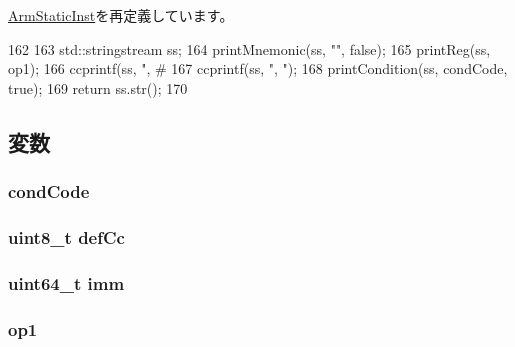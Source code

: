 \hyperlink{classArmISA_1_1ArmStaticInst_a95d323a22a5f07e14d6b4c9385a91896}{ArmStaticInst}を再定義しています。


\begin{DoxyCode}
162 {
163     std::stringstream ss;
164     printMnemonic(ss, "", false);
165     printReg(ss, op1);
166     ccprintf(ss, ", #%
167     ccprintf(ss, ", ");
168     printCondition(ss, condCode, true);
169     return ss.str();
170 }
\end{DoxyCode}


\subsection{変数}
\hypertarget{classArmISA_1_1DataXCondCompImmOp_a273dc0fe84de8f4a9cf52aaf8dc27885}{
\subsubsection[{condCode}]{ {\bf condCode}}}
\label{classArmISA_1_1DataXCondCompImmOp_a273dc0fe84de8f4a9cf52aaf8dc27885}
\hypertarget{classArmISA_1_1DataXCondCompImmOp_a67b4730d4f641c62c31e1b7724f93433}{
\subsubsection[{defCc}]{\setlength{\rightskip}{0pt plus 5cm}uint8\_\-t {\bf defCc}}}
\label{classArmISA_1_1DataXCondCompImmOp_a67b4730d4f641c62c31e1b7724f93433}
\hypertarget{classArmISA_1_1DataXCondCompImmOp_a2b4406ad2843b5aa12d244d01d8fdc69}{
\subsubsection[{imm}]{\setlength{\rightskip}{0pt plus 5cm}uint64\_\-t {\bf imm}}}
\label{classArmISA_1_1DataXCondCompImmOp_a2b4406ad2843b5aa12d244d01d8fdc69}
\hypertarget{classArmISA_1_1DataXCondCompImmOp_a4c465c43ad568f8bcf8ae71480e9cfea}{
\subsubsection[{op1}]{ {\bf op1}}}
\label{classArmISA_1_1DataXCondCompImmOp_a4c465c43ad568f8bcf8ae71480e9cfea}


